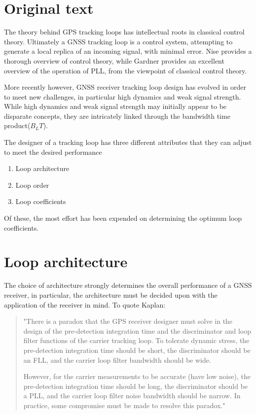 \section{Original text}
The theory behind GPS tracking loops has intellectual roots in classical control theory. Ultimately a \ac{GNSS} tracking loop is a control system, attempting to generate a local replica of an incoming signal, with minimal error. Nise \cite{Nise} provides a thorough overview of control theory, while Gardner \cite{Gardner} provides an excellent overview of the operation of PLL, from the viewpoint of classical control theory.  

More recently however, GNSS receiver tracking loop design has evolved in order to meet new challenges, in particular high dynamics and weak signal strength. While high dynamics and weak signal strength may initially appear to be disparate concepts, they are intricately linked through the bandwidth time product($B_LT$). 

The designer of a tracking loop has three different attributes that they can adjust to meet the desired performance 
\begin{enumerate}
\item{Loop architecture}
\item{Loop order}
\item{Loop coefficients}
\end{enumerate}

Of these, the most effort has been expended on determining the optimum loop coefficients. 

\section{Loop architecture}

The choice of architecture strongly determines the overall performance of a \ac{GNSS} receiver, in particular, the architecture must be decided upon with the application of the receiver in mind. To quote Kaplan: 
\begin{quotation}
"There is a paradox that the GPS receiver designer must solve in the design of the pre-detection integration time and the discriminator and loop filter functions of the carrier tracking loop. To tolerate dynamic stress, the pre-detection integration time should be short, the discriminator should be an \ac{FLL}, and the carrier loop filter bandwidth should be wide.

However, for the carrier measurements to be accurate (have low noise), the pre-detection integration time should be long, the discriminator should be a \ac{PLL}, and the carrier loop filter noise bandwidth should be narrow. In practice, some compromise must be made to resolve this paradox."\cite{Kaplan}
\end{quotation}

